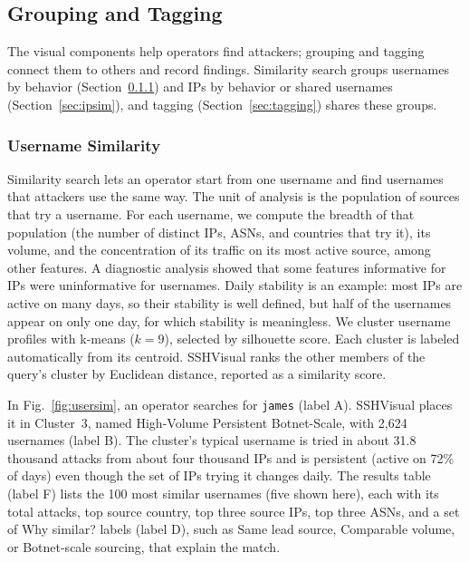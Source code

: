\documentclass[conference]{IEEEtran}
\newcommand{\uname}[1]{\texttt{#1}}   %
\newcommand{\ui}[1]{{\sffamily\hyphenchar\font=-1 #1}}
\begin{document}
\subsection{Grouping and Tagging}
\label{sec:nonvisual}

The visual components help operators find attackers; grouping and tagging connect them to others and record findings.
Similarity search groups usernames by behavior (Section~\ref{sec:usersim}) and IPs by behavior or shared usernames (Section~\ref{sec:ipsim}),
and tagging (Section~\ref{sec:tagging}) shares these groups.

\subsubsection{Username Similarity}
\label{sec:usersim}

Similarity search lets an operator start from one username and find
usernames that attackers use the same way.
The unit of analysis is the population of
sources that try a username. For each username, we compute the breadth of that population (the number of distinct IPs, ASNs, and countries that try it),
its volume, and the concentration of its traffic on its most active source, among other features. A diagnostic analysis showed that some features 
informative for IPs were uninformative for usernames. Daily stability is an example: 
most IPs are active on many days, so their stability is well defined, but half of the usernames appear on only one day, for which
stability is meaningless. We cluster username profiles with k-means ($k=9$), selected by silhouette score. Each
cluster is labeled automatically from its centroid. SSHVisual ranks the other members of the query’s cluster by Euclidean distance, reported as a similarity score.

In Fig.~\ref{fig:usersim}, an operator searches for \uname{james} (label A). SSHVisual places it in Cluster~3, named
\ui{High-Volume Persistent Botnet-Scale},
with 2,624 usernames (label B). The cluster's typical username
is tried in about 31.8 thousand attacks from about four thousand IPs and is persistent (active on 72\% of days) even though the set of IPs trying it changes daily.
The results table (label F) lists the 100 most similar usernames (five shown here), each with its total attacks, top source country, top three source IPs,
top three ASNs, and a set of \ui{Why similar?} labels (label D), such as \ui{Same lead source}, \ui{Comparable volume}, or \ui{Botnet-scale sourcing}, that explain the match.
\end{document}
